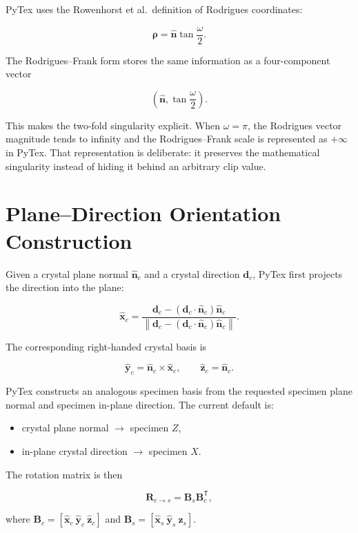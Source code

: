 \documentclass[11pt]{article}
\begin{document}
PyTex uses the Rowenhorst et al.\ definition of Rodrigues coordinates:

\[
\boldsymbol{\rho} = \hat{\mathbf{n}}\tan\frac{\omega}{2}.
\]

The Rodrigues--Frank form stores the same information as a four-component vector

\[
\left(\hat{\mathbf{n}}, \tan\frac{\omega}{2}\right).
\]

This makes the two-fold singularity explicit. When $\omega = \pi$, the Rodrigues vector magnitude tends to infinity and the Rodrigues--Frank scale is represented as $+\infty$ in PyTex. That representation is deliberate: it preserves the mathematical singularity instead of hiding it behind an arbitrary clip value.

\section{Plane--Direction Orientation Construction}

Given a crystal plane normal $\hat{\mathbf{n}}_c$ and a crystal direction $\mathbf{d}_c$, PyTex first projects the direction into the plane:

\[
\hat{\mathbf{x}}_c =
\frac{\mathbf{d}_c - (\mathbf{d}_c \cdot \hat{\mathbf{n}}_c)\hat{\mathbf{n}}_c}
{\left\lVert \mathbf{d}_c - (\mathbf{d}_c \cdot \hat{\mathbf{n}}_c)\hat{\mathbf{n}}_c \right\rVert}.
\]

The corresponding right-handed crystal basis is

\[
\hat{\mathbf{y}}_c = \hat{\mathbf{n}}_c \times \hat{\mathbf{x}}_c, \qquad
\hat{\mathbf{z}}_c = \hat{\mathbf{n}}_c.
\]

PyTex constructs an analogous specimen basis from the requested specimen plane normal and specimen in-plane direction. The current default is:

\begin{itemize}
  \item crystal plane normal $\rightarrow$ specimen $Z$,
  \item in-plane crystal direction $\rightarrow$ specimen $X$.
\end{itemize}

The rotation matrix is then

\[
\mathbf{R}_{c \rightarrow s} =
\mathbf{B}_s \mathbf{B}_c^{\mathsf{T}},
\]

where $\mathbf{B}_c = [\hat{\mathbf{x}}_c\ \hat{\mathbf{y}}_c\ \hat{\mathbf{z}}_c]$ and
$\mathbf{B}_s = [\hat{\mathbf{x}}_s\ \hat{\mathbf{y}}_s\ \hat{\mathbf{z}}_s]$.
\end{document}
